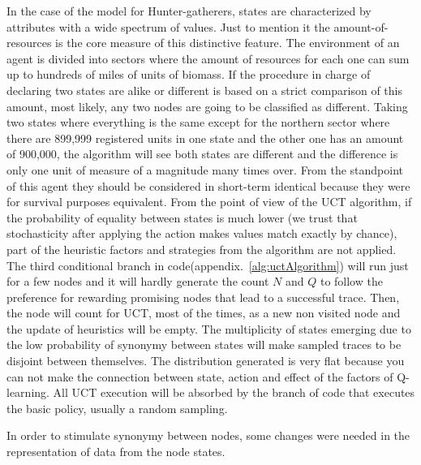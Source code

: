 \documentclass[11pt,oneside,a4paper,openright]{report}
\begin{document}
In the case of the model for Hunter-gatherers, states are characterized by attributes with a wide spectrum of values. Just to mention it the amount-of-resources is the core measure of this distinctive feature. The environment of an agent is divided into sectors where the amount of resources for each one can sum up to hundreds of miles of units of biomass. If the procedure in charge of declaring two states are alike or different is based on a strict comparison of this amount, most likely, any two nodes are going to be classified as different. Taking two states where everything is the same except for the northern sector where there are 899,999 registered units in one state and the other one has an amount of 900,000, the algorithm will see both states are different and the difference is only one unit of measure of a magnitude many times over.
From the standpoint of this agent they should be considered in short-term identical because they were for survival purposes equivalent. From the point of view of the UCT algorithm, if the probability of equality between states is much lower (we trust that stochasticity after applying the action makes values match exactly by chance), part of the heuristic factors and strategies from the algorithm are not applied. The third conditional branch in code(appendix.~\ref{alg:uctAlgorithm}) will run just for a few nodes and it will hardly generate the count $N$ and $Q$ to follow the preference for rewarding promising nodes that lead to a successful trace. Then, the node will count for UCT, most of the times, as a new non visited node and the update of heuristics will be empty. The multiplicity of states emerging due to the low probability of synonymy between states will make sampled traces to be disjoint between themselves. The distribution generated is very flat because you can not make the connection between state, action and effect of the factors of Q-learning. All UCT execution will be absorbed by the branch of code that executes the basic policy, usually a random sampling. 

In order to stimulate synonymy between nodes, some changes were needed in the representation of data 
from the node states.
\end{document}

